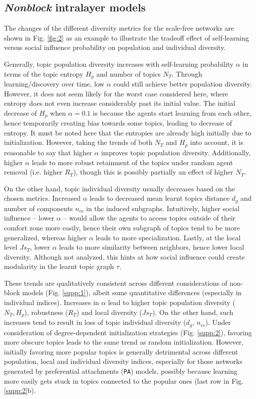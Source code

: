 \documentclass{svproc}
\begin{document}
\subsection{\textit{Nonblock} intralayer models} \label{results:nonblock}

The changes of the different diversity metrics for the scale-free networks are shown in Fig. \ref{fig:2} as an example to illustrate the tradeoff effect of self-learning versus social influence probability on population and individual diversity.

Generally, topic population diversity increases with self-learning probability $\alpha$ in terms of the topic entropy $H_p$ and number of topics $N_T$.
Through learning/discovery over time, low $\alpha$ could still achieve better population diversity.
However, it does not seem likely for the worst case considered here, where entropy does not even increase considerably past its initial value.
The initial decrease of $H_p$ when $\alpha = 0.1$ is because the agents start learning from each other, hence temporarily creating bias towards some topics, leading to decrease of entropy.
It must be noted here that the entropies are already high initially due to initialization.
However, taking the trends of both $N_T$ and $H_p$ into account, it is reasonable to say that higher $\alpha$ improves topic population diversity.
Additionally, higher $\alpha$ leads to more robust retainment of the topics under random agent removal (i.e. higher $R_T$), though this is possibly partially an effect of higher $N_T$.

On the other hand, topic individual diversity usually decreases based on the chosen metrics.
Increased $\alpha$ leads to decreased mean learnt topics distance $d_g$ and number of components $n_{cc}$ in the induced subgraphs.
Intuitively, higher social influence  -- lower $\alpha$ -- would allow the agents to access topics outside of their comfort zone more easily,
    hence their own subgraph of topics tend to be more generalized,
    whereas higher $\alpha$ leads to more specialization.
Lastly, at the local level $Js_T$, lower $\alpha$ leads to more similarity between neighbors, hence lower local diversity.
Although not analyzed, this hints at how social influence could create modularity in the learnt topic graph $\tau$.

These trends are qualitatively consistent across different considerations of non-block models (Fig. \ref{supp:1}), albeit some quantitative differences (especially in individual indices).
Increases in $\alpha$ lead to higher topic population diversity ($N_T, H_p$), robustness ($R_T$) and local diversity ($Js_T$).
On the other hand, such increases tend to result in loss of topic individual diversity ($d_g$, $n_{cc}$).
Under consideration of degree-dependent initialization strategies (Fig. \ref{supp:2}), favoring more obscure topics leads to the same trend as random initialization.
However, initially favoring more popular topics
    is generally detrimental across different population, local and individual diversity indices,
    especially for those networks generated by preferential attachments (\texttt{PA}) models,
        possibly because learning more easily gets stuck in topics connected to the popular ones (last row in Fig. \ref{supp:2}b).
\end{document}
